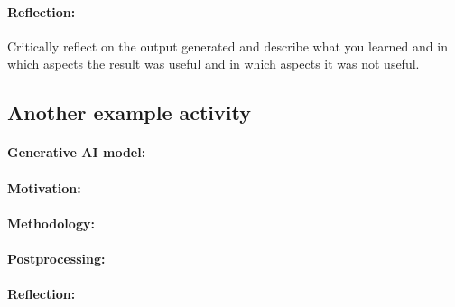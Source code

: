 \documentclass[a4paper,10pt]{article}
\newcommand{\ReplaceMe}[1]{{\color{blue}#1}}
\begin{document}
\paragraph{Reflection:} \ReplaceMe{Critically reflect on the output generated and describe what you learned and in which aspects the result was useful and in which aspects it was not useful.}


\subsection{Another example activity} 
\paragraph{Generative AI model:}
\paragraph{Motivation:}
\paragraph{Methodology:}
\paragraph{Postprocessing:}
\paragraph{Reflection:} 
\end{document}

